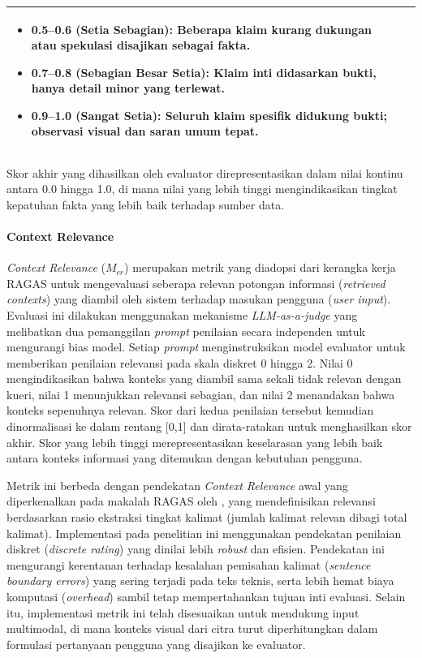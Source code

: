 \begin{table}[H]
{\begin{tabular}{|l|p{10cm}|}
\begin{itemize}[nosep, leftmargin=*]
        \item \textbf{0.5--0.6 (Setia Sebagian)}: Beberapa klaim kurang dukungan atau spekulasi disajikan sebagai fakta.
        \item \textbf{0.7--0.8 (Sebagian Besar Setia)}: Klaim inti didasarkan bukti, hanya detail minor yang terlewat.
        \item \textbf{0.9--1.0 (Sangat Setia)}: Seluruh klaim spesifik didukung bukti; observasi visual dan saran umum tepat.
    \end{itemize} \\ \hline
    \end{tabular}
    }
\end{table}

Skor akhir yang dihasilkan oleh evaluator direpresentasikan dalam nilai kontinu antara 0.0 hingga 1.0, di mana nilai yang lebih tinggi mengindikasikan tingkat kepatuhan fakta yang lebih baik terhadap sumber data.

\paragraph{Context Relevance}
\textit{Context Relevance} ($M_{cr}$) merupakan metrik yang diadopsi dari kerangka kerja RAGAS untuk mengevaluasi seberapa relevan potongan informasi (\textit{retrieved contexts}) yang diambil oleh sistem terhadap masukan pengguna (\textit{user input}). Evaluasi ini dilakukan menggunakan mekanisme \textit{LLM-as-a-judge} yang melibatkan dua pemanggilan \textit{prompt} penilaian secara independen untuk mengurangi bias model. Setiap \textit{prompt} menginstruksikan model evaluator untuk memberikan penilaian relevansi pada skala diskret 0 hingga 2. Nilai 0 mengindikasikan bahwa konteks yang diambil sama sekali tidak relevan dengan kueri, nilai 1 menunjukkan relevansi sebagian, dan nilai 2 menandakan bahwa konteks sepenuhnya relevan. Skor dari kedua penilaian tersebut kemudian dinormalisasi ke dalam rentang [0,1] dan dirata-ratakan untuk menghasilkan skor akhir. Skor yang lebih tinggi merepresentasikan keselarasan yang lebih baik antara konteks informasi yang ditemukan dengan kebutuhan pengguna.

Metrik ini berbeda dengan pendekatan \textit{Context Relevance} awal yang diperkenalkan pada makalah RAGAS oleh \textcite{esRagasAutomatedEvaluation2025}, yang mendefinisikan relevansi berdasarkan rasio ekstraksi tingkat kalimat (jumlah kalimat relevan dibagi total kalimat). Implementasi pada penelitian ini menggunakan pendekatan penilaian diskret (\textit{discrete rating}) yang dinilai lebih \textit{robust} dan efisien. Pendekatan ini mengurangi kerentanan terhadap kesalahan pemisahan kalimat (\textit{sentence boundary errors}) yang sering terjadi pada teks teknis, serta lebih hemat biaya komputasi (\textit{overhead}) sambil tetap mempertahankan tujuan inti evaluasi. Selain itu, implementasi metrik ini telah disesuaikan untuk mendukung input multimodal, di mana konteks visual dari citra turut diperhitungkan dalam formulasi pertanyaan pengguna yang disajikan ke evaluator.

